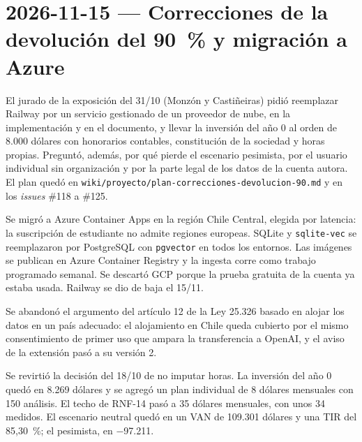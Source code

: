\section{2026-11-15 — Correcciones de la devolución del 90~\% y migración a Azure}

El jurado de la exposición del 31/10 (Monzón y Castiñeiras) pidió reemplazar Railway por un servicio gestionado de un proveedor de nube, en la implementación y en el documento, y llevar la inversión del año 0 al orden de 8.000 dólares con honorarios contables, constitución de la sociedad y horas propias. Preguntó, además, por qué pierde el escenario pesimista, por el usuario individual sin organización y por la parte legal de los datos de la cuenta autora. El plan quedó en \texttt{wiki/proyecto/plan-correcciones-devolucion-90.md} y en los \textit{issues} \#118 a \#125.

Se migró a Azure Container Apps en la región Chile Central, elegida por latencia: la suscripción de estudiante no admite regiones europeas. SQLite y \texttt{sqlite-vec} se reemplazaron por PostgreSQL con \texttt{pgvector} en todos los entornos. Las imágenes se publican en Azure Container Registry y la ingesta corre como trabajo programado semanal. Se descartó GCP porque la prueba gratuita de la cuenta ya estaba usada. Railway se dio de baja el 15/11.

Se abandonó el argumento del artículo 12 de la Ley 25.326 basado en alojar los datos en un país adecuado: el alojamiento en Chile queda cubierto por el mismo consentimiento de primer uso que ampara la transferencia a OpenAI, y el aviso de la extensión pasó a su versión 2.

Se revirtió la decisión del 18/10 de no imputar horas. La inversión del año 0 quedó en 8.269 dólares y se agregó un plan individual de 8 dólares mensuales con 150 análisis. El techo de RNF-14 pasó a 35 dólares mensuales, con unos 34 medidos. El escenario neutral quedó en un VAN de 109.301 dólares y una TIR del 85,30~\%; el pesimista, en $-$97.211.

\bigskip
